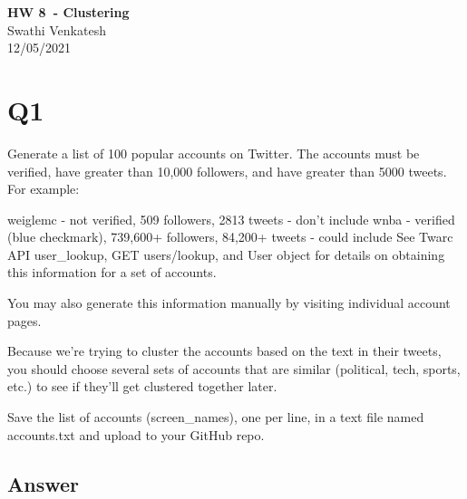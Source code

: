 \documentclass[12pt]{article}
\begin{document}
\begin{centering}
{\large\textbf{HW 8\ - Clustering}}\\ 
Swathi Venkatesh\\
12/05/2021\\
\end{centering}


\section*{Q1}
Generate a list of 100 popular accounts on Twitter. The accounts must be verified, have greater than 10,000 followers, and have greater than 5000 tweets. For example:

weiglemc - not verified, 509 followers, 2813 tweets - don't include
wnba - verified (blue checkmark), 739,600+ followers, 84,200+ tweets - could include
See Twarc API user\_lookup, GET users/lookup, and User object for details on obtaining this information for a set of accounts.

You may also generate this information manually by visiting individual account pages.

Because we're trying to cluster the accounts based on the text in their tweets, you should choose several sets of accounts that are similar (political, tech, sports, etc.) to see if they'll get clustered together later.

Save the list of accounts (screen\_names), one per line, in a text file named accounts.txt and upload to your GitHub repo.

\subsection*{Answer}
\end{document}
